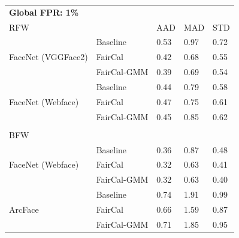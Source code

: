 \begin{table}
\footnotesize
\centering
\begin{tabular}{l l lll}
\toprule
\textbf{Global FPR: 1\%}\\
RFW && AAD & MAD & STD \\
\midrule
\multirow{3}{5em}{FaceNet (VGGFace2)} 
& Baseline    &  0.53  &  0.97  &  0.72  \\
& FairCal     &  0.42  &  0.68  &  0.55  \\
& FairCal-GMM &  0.39  &  0.69  &  0.54  \\
\hline
\multirow{3}{5em}{FaceNet (Webface)} 
& Baseline    &  0.44  &  0.79  &  0.58  \\
& FairCal     &  0.47  &  0.75  &  0.61  \\
& FairCal-GMM &  0.45  &  0.85  &  0.62  \\
\midrule
\\
BFW & & & &    \\
\midrule
\multirow{3}{5em}{FaceNet (Webface)} 
& Baseline    &  0.36  &  0.87  &  0.48  \\
& FairCal     &  0.32  &  0.63  &  0.41  \\
& FairCal-GMM &  0.32  &  0.63  &  0.40  \\
\hline
\multirow{3}{5em}{ArcFace} 
& Baseline    &  0.74  &  1.91  &  0.99  \\
& FairCal     &  0.66  &  1.59  &  0.87  \\
& FairCal-GMM &  0.71  &  1.85  &  0.95  \\
\end{tabular}


\end{table}
